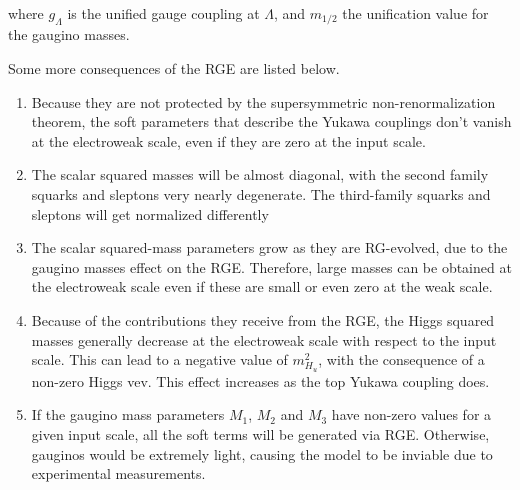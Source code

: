 where $g_\Lambda$ is the unified gauge coupling at $\Lambda$, and $m_{1/2}$ the unification value for the gaugino masses.

Some more consequences of the RGE are listed below. 

\begin{enumerate}
\item Because they are not protected by the supersymmetric non-renormalization theorem, the soft parameters that describe the Yukawa couplings don't vanish at the electroweak scale, even if they are zero at the input scale. %
\item The scalar squared masses will be almost diagonal, with the second family squarks and sleptons very nearly degenerate. The third-family squarks and sleptons will get normalized differently 
\item The scalar squared-mass parameters grow as they are RG-evolved, due to the gaugino masses effect on the RGE. Therefore, large masses can be obtained at the electroweak scale even if these are small or even zero at the weak scale. 
\item Because of the contributions they receive from the RGE, the Higgs squared masses generally decrease at the electroweak scale with respect to the input scale. This can lead to a negative value of $m_{H_u}^2$, with the consequence of a non-zero Higgs vev. This effect increases as the top Yukawa coupling does. %
\item If the gaugino mass parameters $M_1$, $M_2$ and $M_3$ have non-zero values for a given input scale, all the soft terms will be generated via RGE. Otherwise, gauginos would be extremely light, causing the model to be inviable due to experimental measurements.%
\end{enumerate}

